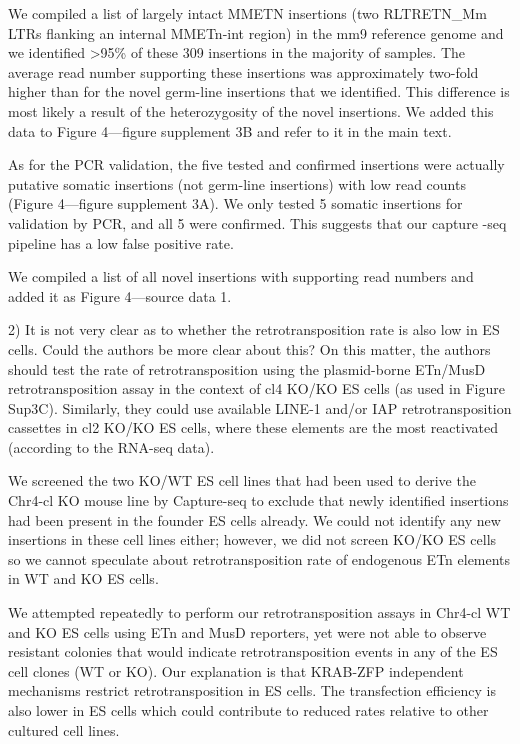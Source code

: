 \documentclass[11pt,a4paper]{article}
\begin{document}
We compiled a list of largely intact MMETN insertions (two RLTRETN\_Mm LTRs flanking an internal MMETn-int region) in the mm9 reference genome and we identified >95\% of these 309 insertions in the majority of samples. The average read number supporting these insertions was approximately two-fold higher than for the novel germ-line insertions that we identified. This difference is most likely a result of the heterozygosity of the novel insertions. We added this data to Figure 4—figure supplement 3B and refer to it in the main text.

As for the PCR validation, the five tested and confirmed insertions were actually putative somatic insertions (not germ-line insertions) with low read counts (Figure 4—figure supplement 3A). We only tested 5 somatic insertions for validation by PCR, and all 5 were confirmed. This suggests that our capture -seq pipeline has a low false positive rate.

We compiled a list of all novel insertions with supporting read numbers and added it as Figure 4—source data 1.

2) It is not very clear as to whether the retrotransposition rate is also low in ES cells. Could the authors be more clear about this? On this matter, the authors should test the rate of retrotransposition using the plasmid-borne ETn/MusD retrotransposition assay in the context of cl4 KO/KO ES cells (as used in Figure Sup3C). Similarly, they could use available LINE-1 and/or IAP retrotransposition cassettes in cl2 KO/KO ES cells, where these elements are the most reactivated (according to the RNA-seq data).

We screened the two KO/WT ES cell lines that had been used to derive the Chr4-cl KO mouse line by Capture-seq to exclude that newly identified insertions had been present in the founder ES cells already. We could not identify any new insertions in these cell lines either; however, we did not screen KO/KO ES cells so we cannot speculate about retrotransposition rate of endogenous ETn elements in WT and KO ES cells.

We attempted repeatedly to perform our retrotransposition assays in Chr4-cl WT and KO ES cells using ETn and MusD reporters, yet were not able to observe resistant colonies that would indicate retrotransposition events in any of the ES cell clones (WT or KO). Our explanation is that KRAB-ZFP independent mechanisms restrict retrotransposition in ES cells. The transfection efficiency is also lower in ES cells which could contribute to reduced rates relative to other cultured cell lines.
\end{document}

